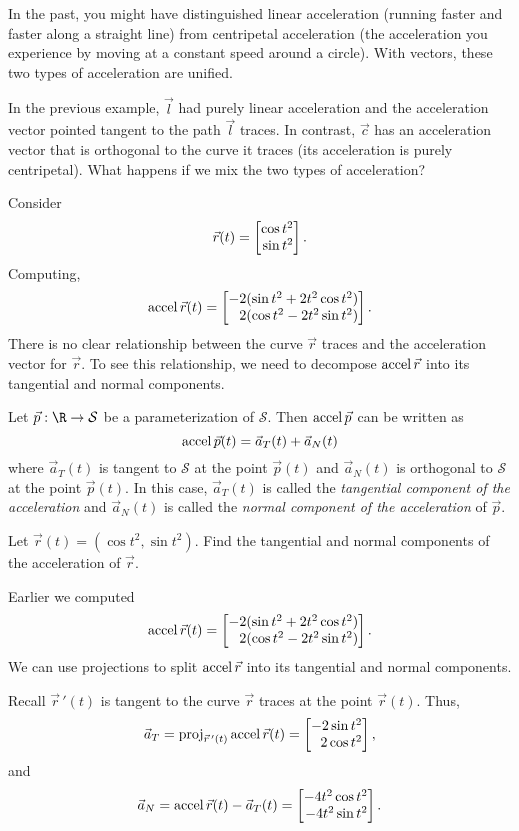 In the past, you might have distinguished linear acceleration (running faster and faster along a straight line) from
centripetal acceleration (the acceleration you experience by moving at a constant speed
around a circle).  With vectors, these two types of acceleration are unified.  

In the previous example, $\vec l$ had purely linear acceleration and
the acceleration vector pointed tangent to the path $\vec l$ traces.
In contrast, $\vec c$ has an acceleration vector that is orthogonal
to the curve it traces (its acceleration is purely centripetal).
What happens if we mix the two types of acceleration?

Consider
\[
	\vec r(t)=\mat{\cos t^2\\\sin t^2}.
\]
Computing, 
\[
	\Accel \vec r(t) = \mat{-2(\sin t^2+2t^2\cos t^2)\\ 2(\cos t^2-2t^2\sin t^2)}.
\]
There is no clear relationship between the curve $\vec r$ traces and the acceleration vector
for $\vec r$.  To see this relationship, we need to decompose $\operatorname{accel} \vec r$ into its tangential
and normal components.

\begin{definition}
	Let $\vec p:\R\to\mathcal S$ be a parameterization of $\mathcal S$.  Then
	$\operatorname{accel} \vec p$ can be written as
	\[
		\operatorname{accel} \vec p(t) = \vec a_T(t)+\vec a_N(t)
	\]
	where $\vec a_T(t)$ is tangent to $\mathcal S$ at the point $\vec p(t)$ and $\vec a_N(t)$
	is orthogonal to $\mathcal S$ at the point $\vec p(t)$.  In this case, $\vec a_T(t)$ is
	called the \emph{tangential component of the acceleration} and $\vec a_N(t)$ is
	called the \emph{normal component of the acceleration} of $\vec p$.
\end{definition}

\begin{example}
	Let $\vec r(t)=(\cos t^2,\sin t^2)$.  Find the tangential and normal components of
	the acceleration of $\vec r$.

	Earlier we computed
	\[
		\Accel \vec r(t) = \mat{-2(\sin t^2+2t^2\cos t^2)\\ 2(\cos t^2-2t^2\sin t^2)}.
	\]
	We can use projections to split $\operatorname{accel} \vec r$ into its tangential and normal components.

	Recall $\vec r\,'(t)$ is tangent to the curve $\vec r$ traces at the point $\vec r(t)$.  Thus,
	\[
		\vec a_T = \Proj_{\vec r\,'(t)} \Accel \vec r(t) = \mat{-2\sin t^2\\ 2\cos t^2},
	\]
	and 
	\[
		\vec a_N = \Accel\vec r(t) - \vec a_T(t) = \mat{-4t^2\cos t^2\\ -4t^2\sin t^2}.
	\]
\end{example}

